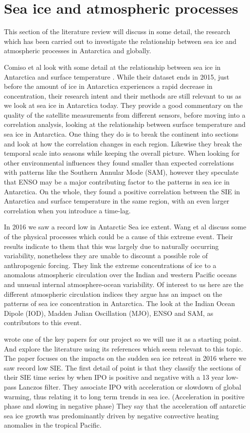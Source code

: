 \documentclass[../main.tex]{subfiles}
\begin{document}
\section{Sea ice and atmospheric processes}
This section of the literature review will discuss in some detail, the research which has been carried out to investigate the relationship between sea ice and atmospheric processes in Antarctica and globally.

Comiso et al look with some detail at the relationship between sea ice in Antarctica and surface temperature \cite{Comiso}. While their dataset ends in 2015, just before the amount of ice in Antarctica experiences a rapid decrease in concentration, their research intent and their methods are still relevant to us as we look at sea ice in Antarctica today. They provide a good commentary on the quality of the satellite measurements from different sensors, before moving into a correlation analysis, looking at the relationship between surface temperature and sea ice in Antarctica. One thing they do is to break the continent into sections and look at how the correlation changes in each region. Likewise they break the temporal scale into seasons while keeping the overall picture. When looking for other environmental influences they found smaller than expected correlations with patterns like the Southern Annular Mode (SAM), however they speculate that ENSO may be a major contributing factor to the patterns in sea ice in Antarctica. On the whole, they found a positive correlation between the SIE in Antarctica and surface temperature in the same region, with an even larger correlation when you introduce a time-lag. 

In 2016 we saw a record low in Antarctic Sea ice extent. Wang et al \cite{Wang2019} discuss some of the physical processes which could be a cause of this extreme event. Their results indicate to them that this was largely due to naturally occurring variability, nonetheless they are unable to discount a possible role of anthropogenic forcing. They link the extreme concentrations of ice to a anomalous atmospheric circulation over the Indian and western Pacific oceans and unusual internal atmosphere-ocean variability. Of interest to us here are the different atmospheric circulation indices they argue has an impact on the patterns of sea ice concentration in Antarctica. The look at the Indian Ocean Dipole (IOD), Madden Julian Oscillation (MJO), ENSO and SAM, as contributors to this event.


\cite{Meehl2019} wrote one of the key papers for our project so we will use it as a starting point. And explore the literature using its references which seem relevant to this topic. The paper focuses on the impacts on the sudden sea ice retreat in 2016 where we saw record low SIE. The first detail of point is that they classify the sections of their SIE time series by when IPO is positive and negative with a 13 year low-pass Lanczos filter. They associate IPO with acceleration or slowdown of global warming, thus relating it to long term trends in sea ice. (Acceleration in positive phase and slowing in negative phase) They say that the acceleration off antarctic sea ice growth was predominantly driven by negative convective heating anomalies in the tropical Pacific.
\end{document}
